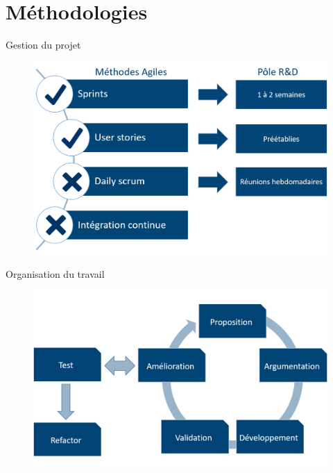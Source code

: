 \documentclass[10pt]{beamer}
\begin{document}
	\section{Méthodologies}
	\begin{frame}{Gestion du projet}
		\begin{figure}\includegraphics[width=\linewidth]{resources/methodologies.png}\end{figure}
	\end{frame}
	\begin{frame}{Organisation du travail}
	\begin{figure}
	 \begin{center}
	 	\includegraphics[scale=0.4]{resources/travail.png}
	 \end{center}
	 \end{figure}
	\end{frame}
\end{document}

